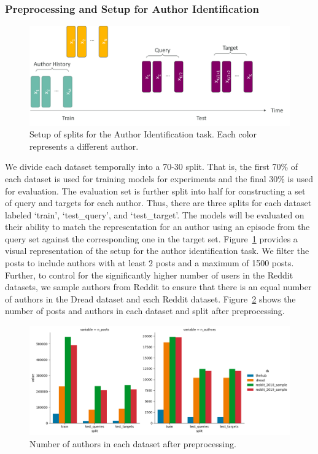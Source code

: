 \subsubsection{Preprocessing and Setup for Author Identification}
\begin{figure}
    \centering
    \includegraphics[width=0.9\linewidth]{stylometryExtensions/figures/train_query_target_split}
    \caption{Setup of splits for the Author Identification task. Each color represents a different author.}
    \label{fig:stylometry_extensions:followingTrail:datasets:splits}
\end{figure}
We divide each dataset temporally into a 70-30 split.
That is, the first 70\% of each dataset is used for training models for experiments and the final 30\% is used for evaluation.
The evaluation set is further split into half for constructing a set of query and targets for each author.
Thus, there are three splits for each dataset labeled `train', `test\_query', and `test\_target'.
The models will be evaluated on their ability to match the representation for an author using an episode from the query set against the corresponding one in the target set.
Figure~\ref{fig:stylometry_extensions:followingTrail:datasets:splits} provides a visual representation of the setup for the author identification task. 
We filter the posts to include authors with at least 2 posts and a maximum of 1500 posts.
Further, to control for the significantly higher number of users in the Reddit datasets, we sample authors from Reddit to ensure that there is an equal number of authors in the Dread dataset and each Reddit dataset.
Figure~\ref{fig:stylometry_extensions:followingTrail:datasets:final_splits} shows the number of posts and authors in each dataset and split after preprocessing.


\begin{figure}
    \centering
    \includegraphics[width=0.9\linewidth]{stylometryExtensions/figures/FinalSplits}
    \caption{Number of authors in each dataset after preprocessing.}
    \label{fig:stylometry_extensions:followingTrail:datasets:final_splits}
\end{figure}

